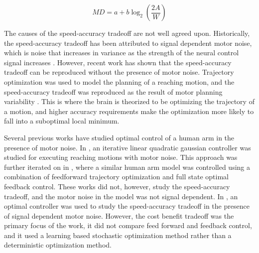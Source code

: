 \documentclass[letterpaper, 10pt, conference]{ieeeconf}
\begin{document}

\begin{equation}
    MD = a + b \log_2 \left(\frac{2A}{W}\right) \label{eq:fitts_law}
\end{equation}

The causes of the speed-accuracy tradeoff are not well agreed upon. Historically, the speed-accuracy tradeoff has been attributed to signal dependent motor noise, which is noise that increases in variance as the strength of the neural control signal increases \cite{signal_dependent_motor_noise}. 
However, recent work has shown that the speed-accuracy tradeoff can be reproduced without the presence of motor noise. Trajectory optimization was used to model the planning of a reaching motion, and the speed-accuracy tradeoff was reproduced as the result of motor planning variability \cite{original_paper_high_fidelity}. This is where the brain is theorized to be optimizing the trajectory of a motion, and higher accuracy requirements make the optimization more likely to fall into a suboptimal local minimum.

Several previous works have studied optimal control of a human arm in the presence of motor noise. In \cite{ilqg}, an iterative linear quadratic gaussian controller was studied for executing reaching motions with motor noise.
This approach was further iterated on in \cite{stochastic_model}, where a similar human arm model was controlled using a combination of feedforward trajectory optimization and full state optimal feedback control. These works did not, however, study the speed-accuracy tradeoff, and the motor noise in the model was not signal dependent. In \cite{cost_benefit_tradeoff}, an optimal controller was used to study the speed-accuracy tradeoff in the presence of signal dependent motor noise. However, the cost benefit tradeoff was the primary focus of the work, it did not compare feed forward and feedback control, and it used a learning based stochastic optimization method rather than a deterministic optimization method.
\end{document}
